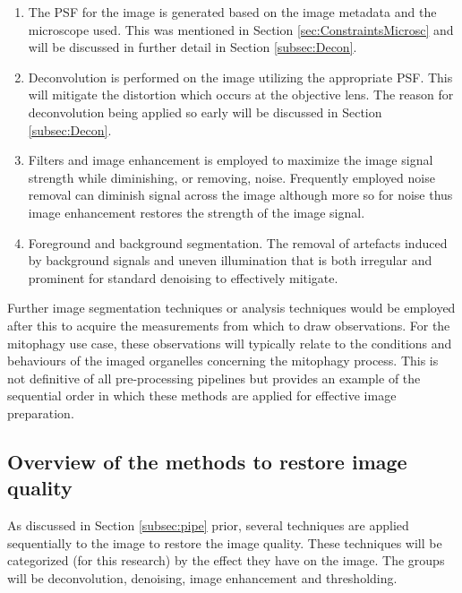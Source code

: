 \begin{enumerate}
    \item The PSF for the image is generated based on the image metadata and the microscope used. This was mentioned in Section \ref{sec:ConstraintsMicrosc} and will be discussed in further detail in Section \ref{subsec:Decon}.
    \item Deconvolution is performed on the image utilizing the appropriate PSF. This will mitigate the distortion which occurs at the objective lens. The reason for deconvolution being applied so early will be discussed in Section \ref{subsec:Decon}.
    \item Filters and image enhancement is employed to maximize the image signal strength while diminishing, or removing, noise. Frequently employed noise removal can diminish signal across the image although more so for noise thus image enhancement restores the strength of the image signal. 
    \item Foreground and background segmentation. The removal of artefacts induced by background signals and uneven illumination that is both irregular and prominent for standard denoising to effectively mitigate.
\end{enumerate}
Further image segmentation techniques or analysis techniques would be employed after this to acquire the measurements from which to draw observations. For the mitophagy use case, these observations will typically relate to the conditions and behaviours of the imaged organelles concerning the mitophagy process. This is not definitive of all pre-processing pipelines but provides an example of the sequential order in which these methods are applied for effective image preparation.

\subsection{Overview of the methods to restore image quality}\label{sec:overview_preproc_methods}
As discussed in Section \ref{subsec:pipe} prior, several techniques are applied sequentially to the image to restore the image quality. These techniques will be categorized (for this research) by the effect they have on the image. The groups will be deconvolution, denoising, image enhancement and thresholding. 

